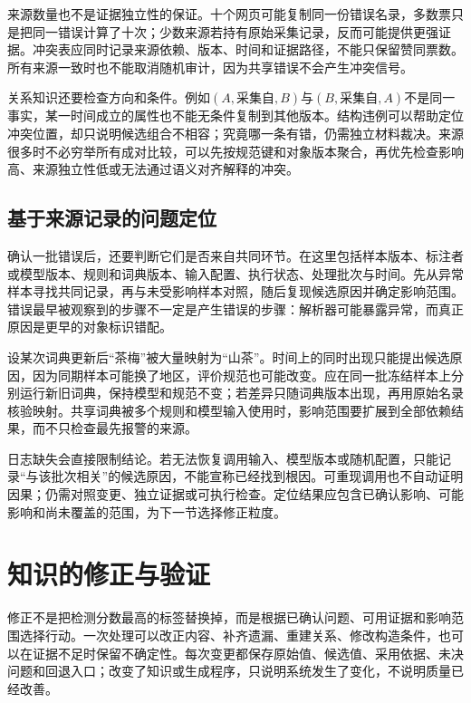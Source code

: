 来源数量也不是证据独立性的保证。十个网页可能复制同一份错误名录，多数票只是把同一错误计算了十次；少数来源若持有原始采集记录，反而可能提供更强证据。冲突表应同时记录来源依赖、版本、时间和证据路径，不能只保留赞同票数。所有来源一致时也不能取消随机审计，因为共享错误不会产生冲突信号。

关系知识还要检查方向和条件。例如$(A,\text{采集自},B)$与$(B,\text{采集自},A)$不是同一事实，某一时间成立的属性也不能无条件复制到其他版本。结构违例可以帮助定位冲突位置，却只说明候选组合不相容；究竟哪一条有错，仍需独立材料裁决。来源很多时不必穷举所有成对比较，可以先按规范键和对象版本聚合，再优先检查影响高、来源独立性低或无法通过语义对齐解释的冲突。

\subsection{基于来源记录的问题定位}
\label{sec:knowledge-quality-assessment-correction-provenance-localization}

确认一批错误后，还要判断它们是否来自共同环节。在这里包括样本版本、标注者或模型版本、规则和词典版本、输入配置、执行状态、处理批次与时间。先从异常样本寻找共同记录，再与未受影响样本对照，随后复现候选原因并确定影响范围。错误最早被观察到的步骤不一定是产生错误的步骤：解析器可能暴露异常，而真正原因是更早的对象标识错配。

设某次词典更新后“茶梅”被大量映射为“山茶”。时间上的同时出现只能提出候选原因，因为同期样本可能换了地区，评价规范也可能改变。应在同一批冻结样本上分别运行新旧词典，保持模型和规范不变；若差异只随词典版本出现，再用原始名录核验映射。共享词典被多个规则和模型输入使用时，影响范围要扩展到全部依赖结果，而不只检查最先报警的来源。

日志缺失会直接限制结论。若无法恢复调用输入、模型版本或随机配置，只能记录“与该批次相关”的候选原因，不能宣称已经找到根因。可重现调用也不自动证明因果；仍需对照变更、独立证据或可执行检查。定位结果应包含已确认影响、可能影响和尚未覆盖的范围，为下一节选择修正粒度。

\section{知识的修正与验证}
\label{sec:knowledge-quality-assessment-correction-repair}

修正不是把检测分数最高的标签替换掉，而是根据已确认问题、可用证据和影响范围选择行动。一次处理可以改正内容、补齐遗漏、重建关系、修改构造条件，也可以在证据不足时保留不确定性。每次变更都保存原始值、候选值、采用依据、未决问题和回退入口；改变了知识或生成程序，只说明系统发生了变化，不说明质量已经改善。

